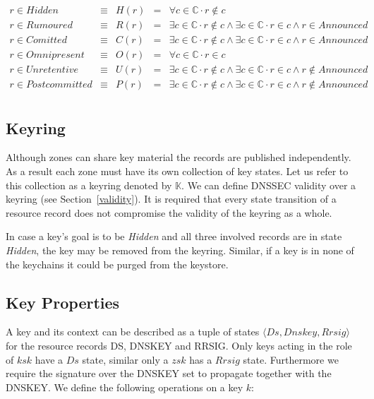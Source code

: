 \documentclass[twoside,english, a4paper]{article}
\begin{document}
\begin{displaymath}
\begin{array}{lllll}
       r\in Hidden      & \equiv & H(r) &=& \forall c \in \mathbb{C} \cdot r \not \in c \\
       r\in Rumoured    & \equiv & R(r) &=& \exists c \in \mathbb{C} \cdot r \not \in c \wedge \exists c \in \mathbb{C} \cdot r\in c \wedge r\in Announced\\
       r\in Comitted    & \equiv & C(r) &=& \exists c \in \mathbb{C} \cdot r \not \in c \wedge \exists c \in \mathbb{C} \cdot r\in c \wedge r\in Announced\\
       r\in Omnipresent & \equiv & O(r) &=& \forall c \in \mathbb{C} \cdot r \in c \\
       r\in Unretentive    & \equiv & U(r) &=& \exists c \in \mathbb{C} \cdot r \not \in c \wedge \exists c \in \mathbb{C} \cdot r \in c \wedge r \notin Announced \\
       r\in Postcommitted  & \equiv & P(r) &=& \exists c \in \mathbb{C} \cdot r \not \in c \wedge \exists c \in \mathbb{C} \cdot r \in c \wedge r \notin Announced \\
\end{array}
\end{displaymath}

\subsection{Keyring}

Although zones can share key material the records are published 
independently. As a result each zone must have its own collection of
key states. Let us refer to this collection as a keyring denoted 
by $\mathbb{K}$. We can
define DNSSEC validity over a keyring (see Section~\ref{validity}).
It is required that every state transition of a resource record does 
not compromise the validity of the keyring as a whole.

In case a key's goal is to be \emph{Hidden} and all three involved
records are in state \emph{Hidden}, the key may be removed from the
keyring. Similar, if a key is in none of the keychains it could be
purged from the keystore.

\subsection{Key Properties}
\label{sec:key_properties}

A key and its context can be described as a tuple of states $\langle 
Ds,Dnskey,Rrsig\rangle$ for the resource records DS, DNSKEY and RRSIG.
Only keys acting in the role of $ksk$ have a $Ds$ state, similar
only a $zsk$ has a $Rrsig$ state. Furthermore we require the signature
over the DNSKEY set to propagate together with the DNSKEY.
We define the following operations on a key $k$:
\end{document}
